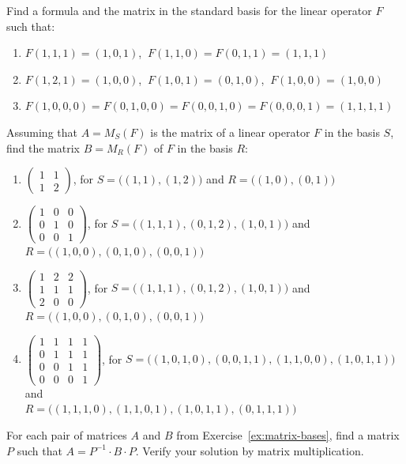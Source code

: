 \begin{exercise}
Find a formula and the matrix in the standard basis for the linear operator $F$ such that:
\begin{enumerate}[label=(\alph*)]
\item $F(1,1,1) = (1,0,1)$, $\ F(1,1,0) = F(0,1,1) = (1,1,1)$
\item $F(1,2,1) = (1,0,0)$, $\ F(1,0,1) = (0,1,0)$, $\ F(1,0,0) = (1,0,0)$
\item $F(1,0,0,0) = F(0,1,0,0) = F(0,0,1,0) = F(0,0,0,1) = (1,1,1,1)$
\end{enumerate}
\end{exercise}

\begin{exercise}\label{ex:matrix-bases}
Assuming that $A = M_S(F)$ is the matrix of a linear operator $F$ in the basis $S$, find the matrix
$B = M_R(F)$ of $F$ in the basis $R$:
\begin{enumerate}[label=(\alph*)]
\item $\left( \begin{array}{cc} 1 & 1\\ 1 & 2 \end{array} \right)$, for $S = \big((1,1),(1,2)\big)$ and
$R = \big((1,0),(0,1)\big)$
\item $\left( \begin{array}{ccc} 1 & 0 & 0\\ 0 & 1 & 0\\ 0 & 0 & 1 \end{array} \right)$, for
$S = \big((1,1,1),(0,1,2),(1,0,1)\big)$ and $R = \big((1,0,0),(0,1,0),(0,0,1)\big)$
\item $\left( \begin{array}{ccc} 1 & 2 & 2\\ 1 & 1 & 1\\ 2 & 0 & 0 \end{array} \right)$, for
$S = \big((1,1,1),(0,1,2),(1,0,1)\big)$ and $R = \big((1,0,0),(0,1,0),(0,0,1)\big)$
\item $\left( \begin{array}{cccc} 1 & 1 & 1 & 1\\ 0 & 1 & 1 & 1\\ 0 & 0 & 1 & 1\\ 0 & 0 & 0 & 1
\end{array} \right)$, for $S = \big((1,0,1,0),(0,0,1,1),(1,1,0,0),(1,0,1,1)\big)$ and\\
$R = \big((1,1,1,0),(1,1,0,1),(1,0,1,1),(0,1,1,1)\big)$
\end{enumerate}
\end{exercise}

\begin{exercise}
For each pair of matrices $A$ and $B$ from Exercise~\ref{ex:matrix-bases}, find a matrix $P$ such that
$A = P^{-1}\cdot B\cdot P$. Verify your solution by matrix multiplication.
\end{exercise}
